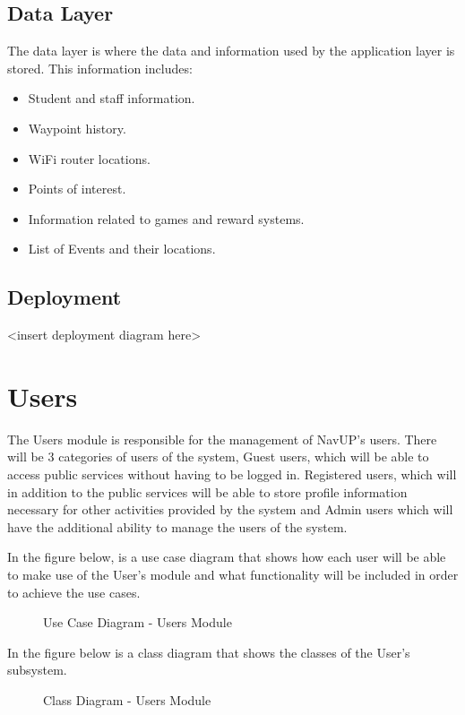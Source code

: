\documentclass[english]{article}
\begin{document}
	    \subsection{Data Layer}
	        The data layer is where the data and information used by the application layer is stored. This information includes:
	        \begin{itemize}
	            \item Student and staff information.
	            \item Waypoint history.
	            \item WiFi router locations.
	            \item Points of interest.
	            \item Information related to games and reward systems.
	            \item List of Events and their locations.

	        \end{itemize}

	   \subsection{Deployment}
	        \textless insert deployment diagram here\textgreater

	\section{Users}
		The Users module is responsible for the management of NavUP's users. There will be 3 categories of users of the system, Guest users, which will be able to access public services without having to be logged in. Registered users, which will in addition to the public services will be able to store profile information necessary for other activities provided by the system and Admin users which will have the additional ability to manage the users of the system.
		
		In the figure below, is a use case diagram that shows how each user will be able to make use of the User's module and what functionality will be included in order to achieve the use cases.
		\begin{figure}[H]
            \centering	            \centerline{}
            \caption{Use Case Diagram - Users Module}
        \end{figure}
		
		In the figure below is a class diagram that shows the classes of the User's subsystem.
	    \begin{figure}[H]
            \centering	            \centerline{}
            \caption{Class Diagram - Users Module}
        \end{figure}
        
\end{document}
